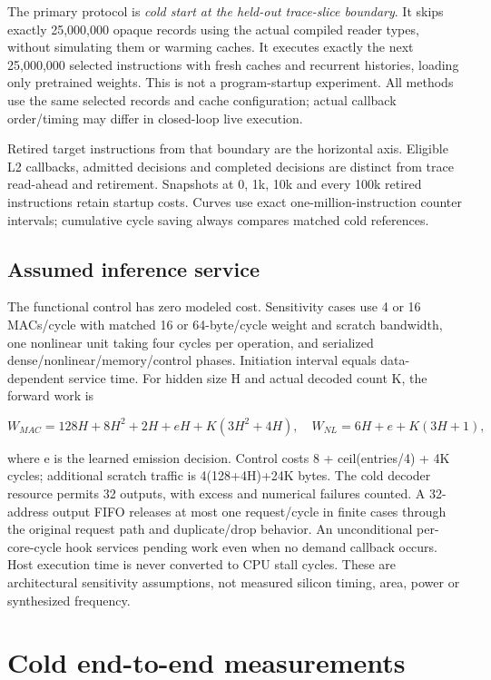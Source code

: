 \documentclass[10pt]{article}
\begin{document}
The primary protocol is \emph{cold start at the held-out trace-slice boundary}. It skips exactly 25,000,000 opaque records using the actual compiled reader types, without simulating them or warming caches. It executes exactly the next 25,000,000 selected instructions with fresh caches and recurrent histories, loading only pretrained weights. This is not a program-startup experiment. All methods use the same selected records and cache configuration; actual callback order/timing may differ in closed-loop live execution.

Retired target instructions from that boundary are the horizontal axis. Eligible L2 callbacks, admitted decisions and completed decisions are distinct from trace read-ahead and retirement. Snapshots at 0, 1k, 10k and every 100k retired instructions retain startup costs. Curves use exact one-million-instruction counter intervals; cumulative cycle saving always compares matched cold references.

\subsection{Assumed inference service}

The functional control has zero modeled cost. Sensitivity cases use 4 or 16 MACs/cycle with matched 16 or 64-byte/cycle weight and scratch bandwidth, one nonlinear unit taking four cycles per operation, and serialized dense/nonlinear/memory/control phases. Initiation interval equals data-dependent service time. For hidden size H and actual decoded count K, the forward work is

\[W_{MAC}=128H+8H^2+2H+eH+K(3H^2+4H),\quad W_{NL}=6H+e+K(3H+1),\]

where e is the learned emission decision. Control costs 8 + ceil(entries/4) + 4K cycles; additional scratch traffic is 4(128+4H)+24K bytes. The cold decoder resource permits 32 outputs, with excess and numerical failures counted. A 32-address output FIFO releases at most one request/cycle in finite cases through the original request path and duplicate/drop behavior. An unconditional per-core-cycle hook services pending work even when no demand callback occurs. Host execution time is never converted to CPU stall cycles. These are architectural sensitivity assumptions, not measured silicon timing, area, power or synthesized frequency.

\clearpage\section{Cold end-to-end measurements}
\end{document}
